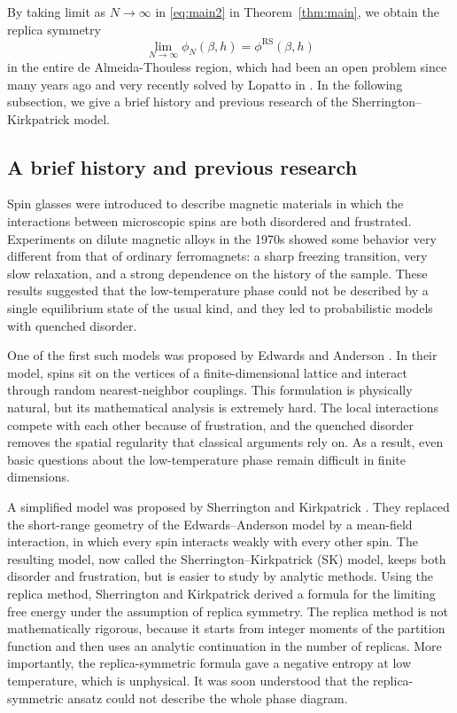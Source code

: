 \documentclass[11pt]{article}
\numberwithin{equation}{section}
\newcommand{\1}{\mathbf 1}
\begin{document}
By taking limit as $N\rightarrow \infty$ in \eqref{eq:main2} in Theorem~\ref{thm:main}, we obtain the replica symmetry
\[
\lim _{N\rightarrow \infty } \phi _N(\beta ,h) = \phi ^{\mathrm{RS}}(\beta ,h)
\]
in the entire de Almeida-Thouless region, which had been an open problem since many years ago and very recently solved by Lopatto in \cite{Lopatto}.
In the following subsection, we give a brief history and previous research of the Sherrington--Kirkpatrick model.

\subsection{A brief history and previous research} 
Spin glasses were introduced to describe magnetic materials in which the interactions between microscopic spins are both disordered and frustrated. Experiments on dilute magnetic alloys in the 1970s showed some behavior very different from that of ordinary ferromagnets: a sharp freezing transition, very slow relaxation, and a strong dependence on the history of the sample. These results suggested that the low-temperature phase could not be described by a single equilibrium state of the usual kind, and they led to probabilistic models with quenched disorder.

One of the first such models was proposed by Edwards and Anderson \cite{EdwardsAnderson1975}. In their model, spins sit on the vertices of a finite-dimensional lattice and interact through random nearest-neighbor couplings. This formulation is physically natural, but its mathematical analysis is extremely hard. The local interactions compete with each other because of frustration, and the quenched disorder removes the spatial regularity that classical arguments rely on. As a result, even basic questions about the low-temperature phase remain difficult in finite dimensions.

A simplified model was proposed by Sherrington and Kirkpatrick \cite{SherringtonKirkpatrick1975}. They replaced the short-range geometry of the Edwards--Anderson model by a mean-field interaction, in which every spin interacts weakly with every other spin. The resulting model, now called the Sherrington--Kirkpatrick (SK) model, keeps both disorder and frustration, but is easier to study by analytic methods. Using the replica method, Sherrington and Kirkpatrick derived a formula for the limiting free energy under the assumption of replica symmetry. The replica method is not mathematically rigorous, because it starts from integer moments of the partition function and then uses an analytic continuation in the number of replicas. More importantly, the replica-symmetric formula gave a negative entropy at low temperature, which is unphysical. It was soon understood that the replica-symmetric ansatz could not describe the whole phase diagram.
\end{document}
